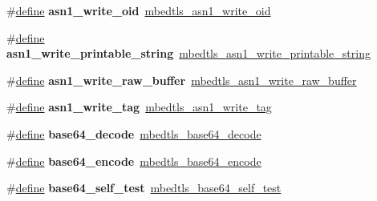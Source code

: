 \begin{DoxyCompactItemize}
\item 
\mbox{\label{compat-1_83_8h_a2500a2c904db615c5cfd1903c4945a7b}} 
\#\hyperlink{structdefine}{define} {\bfseries asn1\+\_\+write\+\_\+oid}~\hyperlink{asn1write_8h_ab437fb4183494e4c9cf4b6e15ca236d6}{mbedtls\+\_\+asn1\+\_\+write\+\_\+oid}
\item 
\mbox{\label{compat-1_83_8h_ab2a974e3e26eacc6013212a7e6886fa7}} 
\#\hyperlink{structdefine}{define} {\bfseries asn1\+\_\+write\+\_\+printable\+\_\+string}~\hyperlink{asn1write_8h_a400af5e542195c14533baf2f377d31d1}{mbedtls\+\_\+asn1\+\_\+write\+\_\+printable\+\_\+string}
\item 
\mbox{\label{compat-1_83_8h_a619517bd574509a6dc72ab084bdfc23d}} 
\#\hyperlink{structdefine}{define} {\bfseries asn1\+\_\+write\+\_\+raw\+\_\+buffer}~\hyperlink{asn1write_8h_a1ecd132a57faf95c61423dc9cdc30143}{mbedtls\+\_\+asn1\+\_\+write\+\_\+raw\+\_\+buffer}
\item 
\mbox{\label{compat-1_83_8h_a3b0f4dd261fd32b4c148d64488696a9d}} 
\#\hyperlink{structdefine}{define} {\bfseries asn1\+\_\+write\+\_\+tag}~\hyperlink{asn1write_8h_a2247b80bd02e2981dc26ce62ffbb1859}{mbedtls\+\_\+asn1\+\_\+write\+\_\+tag}
\item 
\mbox{\label{compat-1_83_8h_a99be317a0c7a98be79a52ee3d1968310}} 
\#\hyperlink{structdefine}{define} {\bfseries base64\+\_\+decode}~\hyperlink{base64_8h_a1e8abeb72a244acb346fc4ac3083886c}{mbedtls\+\_\+base64\+\_\+decode}
\item 
\mbox{\label{compat-1_83_8h_ab558f8b931e57e22623bb0a35c0bc56d}} 
\#\hyperlink{structdefine}{define} {\bfseries base64\+\_\+encode}~\hyperlink{base64_8h_a87c42fcb843b964e68015a46aad5bffd}{mbedtls\+\_\+base64\+\_\+encode}
\item 
\mbox{\label{compat-1_83_8h_a428c92a84f3a409ca88e981b886b6919}} 
\#\hyperlink{structdefine}{define} {\bfseries base64\+\_\+self\+\_\+test}~\hyperlink{base64_8h_ab24d0f315da798d7ea412f0e74411cd7}{mbedtls\+\_\+base64\+\_\+self\+\_\+test}
\item 
\mbox{\label{compat-1_83_8h_a9bdd9c6624727bb7af5776f9d2dcce20}} 

\end{DoxyCompactItemize}
